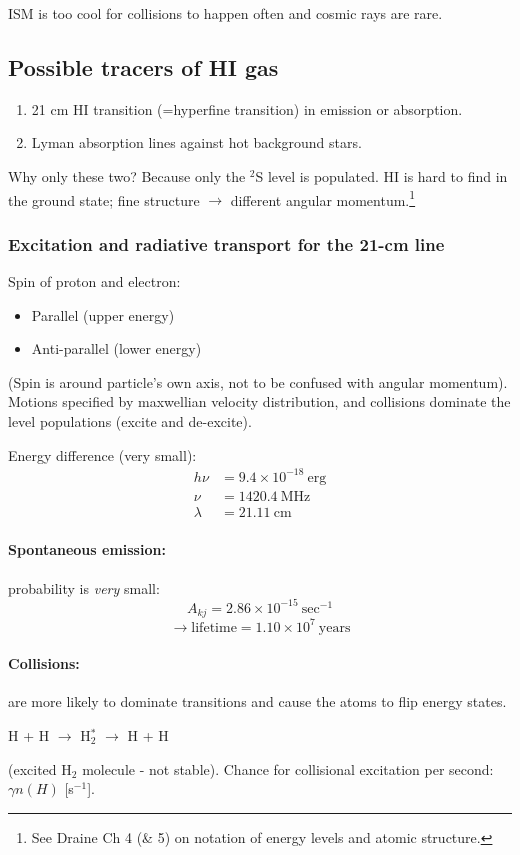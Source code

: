\documentclass[12pt]{article}
\newcommand{\mar}[1]{\hspace{0pt}\marginpar{-\textcolor{black}{#1}-}}
\begin{document}
ISM is too cool for collisions to happen often and cosmic rays are rare.

\subsection{Possible tracers of HI gas}
\begin{enumerate}[noitemsep]
    \item 21 cm HI transition (=hyperfine transition) in emission or absorption.
    \item Lyman absorption lines against hot background stars.
\end{enumerate}
Why only these two? Because only the $^{2}$S level is populated. HI is hard to
find in the ground state; fine structure $\rightarrow$ different angular
momentum.\footnote{
    See Draine Ch 4 (\& 5) on notation of energy levels and
    atomic structure.}

\newpage
\subsubsection{Excitation and radiative transport for the 21-cm line}
\mar{34}Spin of proton and electron:
\begin{itemize}
    \item Parallel (upper energy)
    \item Anti-parallel (lower energy)
\end{itemize}
(Spin is around particle's own axis, not to be confused with angular
momentum). Motions specified by maxwellian velocity distribution, and
collisions dominate the level populations (excite and de-excite).

Energy difference (very small):
\begin{align*}
    h\nu &= 9.4\times10^{-18}\:\mathrm{erg}\\
    \nu &= 1420.4\:\mathrm{MHz}\\
    \lambda &= 21.11\:\mathrm{cm}
\end{align*}

\paragraph{Spontaneous emission:} probability is \emph{very} small:
\[
    A_{kj} = 2.86\times10^{-15}\:\mathrm{sec}^{-1}
    \]
\[
    \rightarrow \mathrm{lifetime} = 1.10\times10^{7}\:\mathrm{years}
    \]
\paragraph{Collisions:}
are more likely to dominate transitions and cause the atoms to flip energy states.
\begin{center}
    H + H $\rightarrow$ H$_{2}^{*}$ $\rightarrow$ H + H
\end{center}
(excited H$_{2}$ molecule - not stable). Chance for collisional excitation
per second: $\gamma n(H)$ [s$^{-1}$].
\end{document}
